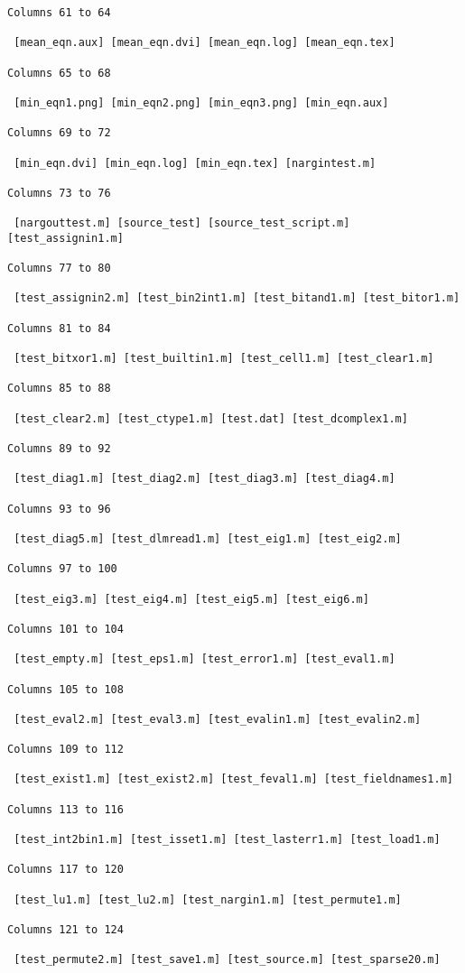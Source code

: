 \begin{verbatim}
Columns 61 to 64

 [mean_eqn.aux] [mean_eqn.dvi] [mean_eqn.log] [mean_eqn.tex] 
 
Columns 65 to 68

 [min_eqn1.png] [min_eqn2.png] [min_eqn3.png] [min_eqn.aux] 
 
Columns 69 to 72

 [min_eqn.dvi] [min_eqn.log] [min_eqn.tex] [nargintest.m] 
 
Columns 73 to 76

 [nargouttest.m] [source_test] [source_test_script.m] [test_assignin1.m] 
 
Columns 77 to 80

 [test_assignin2.m] [test_bin2int1.m] [test_bitand1.m] [test_bitor1.m] 
 
Columns 81 to 84

 [test_bitxor1.m] [test_builtin1.m] [test_cell1.m] [test_clear1.m] 
 
Columns 85 to 88

 [test_clear2.m] [test_ctype1.m] [test.dat] [test_dcomplex1.m] 
 
Columns 89 to 92

 [test_diag1.m] [test_diag2.m] [test_diag3.m] [test_diag4.m] 
 
Columns 93 to 96

 [test_diag5.m] [test_dlmread1.m] [test_eig1.m] [test_eig2.m] 
 
Columns 97 to 100

 [test_eig3.m] [test_eig4.m] [test_eig5.m] [test_eig6.m] 
 
Columns 101 to 104

 [test_empty.m] [test_eps1.m] [test_error1.m] [test_eval1.m] 
 
Columns 105 to 108

 [test_eval2.m] [test_eval3.m] [test_evalin1.m] [test_evalin2.m] 
 
Columns 109 to 112

 [test_exist1.m] [test_exist2.m] [test_feval1.m] [test_fieldnames1.m] 
 
Columns 113 to 116

 [test_int2bin1.m] [test_isset1.m] [test_lasterr1.m] [test_load1.m] 
 
Columns 117 to 120

 [test_lu1.m] [test_lu2.m] [test_nargin1.m] [test_permute1.m] 
 
Columns 121 to 124

 [test_permute2.m] [test_save1.m] [test_source.m] [test_sparse20.m] 
 

\end{verbatim}
